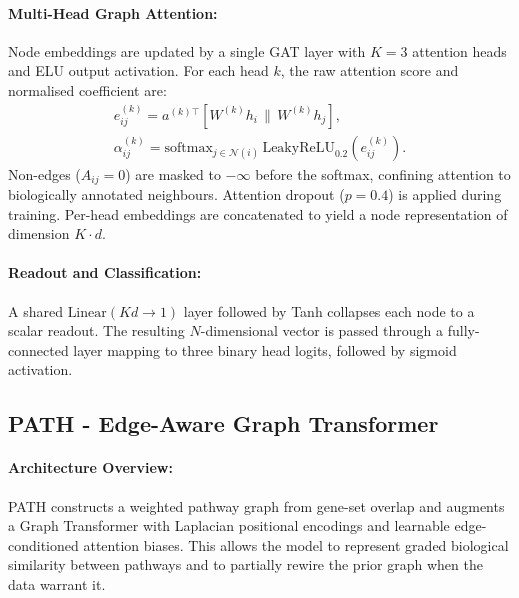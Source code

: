 \documentclass[sigconf]{acmart}
\begin{document}
\paragraph{Multi-Head Graph Attention:}
Node embeddings are updated by a single GAT layer with $K = 3$
attention heads and ELU output activation. For each head $k$, the
raw attention score and normalised coefficient are:
\begin{equation}
\begin{gathered}
e^{(k)}_{ij} = a^{(k)\top}\!\left[W^{(k)}h_i \,\|\, W^{(k)}h_j\right],
\\[4pt]
\alpha^{(k)}_{ij} = \text{softmax}_{j \in \mathcal{N}(i)}\,
\text{LeakyReLU}_{0.2}\!\left(e^{(k)}_{ij}\right).
\end{gathered}
\end{equation}
Non-edges ($A_{ij} = 0$) are masked to $-\infty$ before the softmax,
confining attention to biologically annotated neighbours. Attention
dropout ($p = 0.4$) is applied during training. Per-head embeddings
are concatenated to yield a node representation of dimension $K \cdot d$.

\paragraph{Readout and Classification:}
A shared $\text{Linear}(Kd \to 1)$ layer followed by Tanh collapses
each node to a scalar readout. The resulting $N$-dimensional vector
is passed through a fully-connected layer mapping to three binary head
logits, followed by sigmoid activation.

\subsection{PATH - Edge-Aware Graph Transformer}

\paragraph{Architecture Overview:}
PATH constructs a weighted pathway graph from gene-set overlap and
augments a Graph Transformer with Laplacian positional encodings and
learnable edge-conditioned attention biases. This allows the model to
represent graded biological similarity between pathways and to
partially rewire the prior graph when the data warrant it.
\end{document}
